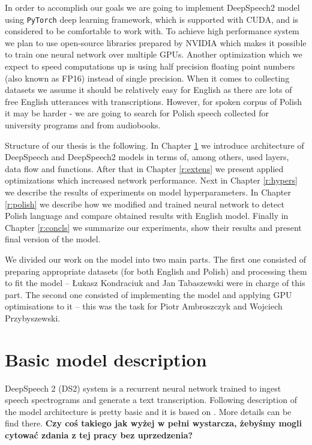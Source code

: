 \documentclass[licencjacka,en]{pracamgr}
\begin{document}
In order to accomplish our goals we are going to implement DeepSpeech2 model using \texttt{PyTorch} deep learning framework, which is supported with CUDA, and is considered to be comfortable to work with. To achieve high performance system we plan to use open-source libraries prepared by NVIDIA which makes it possible to train one neural network over multiple GPUs. Another optimization which we expect to speed computations up is using half precision floating point numbers (also known as FP16) instead of single precision.  When it comes to collecting datasets we assume it should be relatively easy for English as there are lots of free English utterances with transcriptions. However, for spoken corpus of Polish it may be harder - we are going to search for Polish speech collected for university programs and from audiobooks.

Structure of our thesis is the following. In Chapter \ref{r:desc} we introduce architecture of DeepSpeech and DeepSpeech2 models in terms of, among others, used layers, data flow and functions. After that in Chapter \ref{r:extens} we present applied optimizations which increased network performance. Next in Chapter \ref{r:hypers} we describe the results of experiments on model hyperparameters. In Chapter \ref{r:polish} we describe how we modified and trained neural network to detect Polish language and compare obtained results with English model. Finally in Chapter \ref{r:concls} we summarize our experiments, show their results and present final version of the model.

We divided our work on the model into two main parts. The first one consisted of preparing appropriate datasets (for both English and Polish) and processing them to fit the model -- Łukasz Kondraciuk and Jan Tabaszewski were in charge of this part. The second one consisted of implementing the model and applying GPU optimisations to it -- this was the task for Piotr Ambroszczyk and Wojciech Przybyszewski.
\chapter{Basic model description}\label{r:desc}

DeepSpeech 2 (DS2) system is a recurrent neural network trained to ingest speech spectrograms and generate a text transcription.
Following description of the model architecture is pretty basic and it is based on \cite{DS2}. More details can be find there.
\textbf{Czy coś takiego jak wyżej w pełni wystarcza, żebyśmy mogli cytować zdania z tej pracy bez uprzedzenia?}
\end{document}
